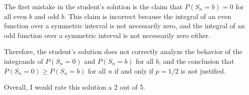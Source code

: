 The first mistake in the student's solution is the claim that $P(S_n = b) = 0$ for all even $b$ and odd $b$. This claim is incorrect because the integral of an even function over a symmetric interval is not necessarily zero, and the integral of an odd function over a symmetric interval is not necessarily zero either. 

Therefore, the student's solution does not correctly analyze the behavior of the integrands of $P(S_n = 0)$ and $P(S_n = b)$ for all $b$, and the conclusion that $P(S_n = 0) \geq P(S_n = b)$ for all $n$ if and only if $p = 1/2$ is not justified. 

Overall, I would rate this solution a 2 out of 5.
